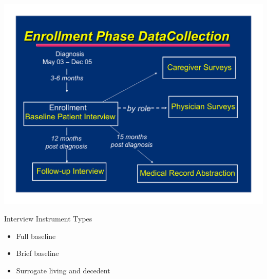 \documentclass[11pt,handout]{beamer}
\begin{document}
\begin{frame}{}

\begin{center}
\includegraphics[width= 1.0\textwidth]{./figures/initial_instruments.pdf}
\end{center}

\end{frame}

\begin{frame}{Interview Instrument Types}

\begin{itemize}

  \item Full baseline 
  
  \medskip
  
  \item Brief baseline
  
  \medskip
  
  \item Surrogate living and decedent

\end{itemize}
	
\end{frame}
\end{document}
